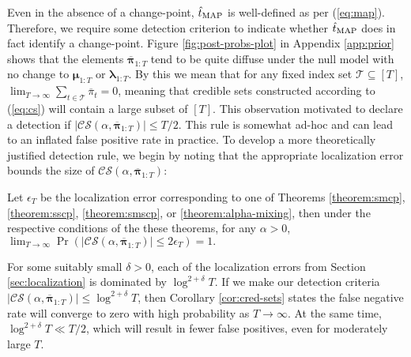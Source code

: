Even in the absence of a change-point, $\hat{t}_{\normalfont \text{MAP}}$ is well-defined as per (\ref{eq:map}). Therefore, we require some detection criterion to indicate whether $\hat{t}_{\normalfont \text{MAP}}$ does in fact identify a change-point. Figure \ref{fig:post-probs-plot} in Appendix \ref{app:prior} shows that the elements $\overline{\boldsymbol{\pi}}_{1:T}$ tend to be quite diffuse under the null model with no change to $\boldsymbol{\mu}_{1:T}$ or $\boldsymbol{\lambda}_{1:T}$. By this we mean that for any fixed index set $\mathcal{T} \subseteq[T]$, $\lim_{T\to\infty} \sum_{t\in\mathcal{T}} \overline{\pi}_t = 0$, meaning that credible sets constructed according to (\ref{eq:cs}) will contain a large subset of $[T]$. This observation motivated \cite{Cappello22} to declare a detection if $|\mathcal{CS}(\alpha,\overline{\boldsymbol{\pi}}_{1:T})| \leq T/2$. This rule is somewhat ad-hoc and can lead to an inflated false positive rate in practice. To develop a more theoretically justified detection rule, we begin by noting that the appropriate localization error bounds the size of $\mathcal{CS}(\alpha, \overline{\boldsymbol{\pi}}_{1:T})$:

\begin{corollary} \label{cor:cred-sets}
    Let $\epsilon_T$ be the localization error corresponding to one of Theorems \ref{theorem:smcp}, \ref{theorem:sscp}, \ref{theorem:smscp}, or \ref{theorem:alpha-mixing}, then under the respective conditions of the these theorems, for any $\alpha > 0$, $\lim_{T \to \infty} \Pr\left(|\mathcal{CS}(\alpha, \overline{\boldsymbol{\pi}}_{1:T})| \leq 2 \epsilon_T \right) = 1.$
\end{corollary}
For some suitably small $\delta > 0$, each of the localization errors from Section \ref{sec:localization} is dominated by $\log^{2+\delta} T$. If we make our detection criteria $|\mathcal{CS}(\alpha,\overline{\boldsymbol{\pi}}_{1:T})| \leq \log^{2+\delta} T$, then Corollary \ref{cor:cred-sets} states the false negative rate will converge to zero with high probability as $T \to \infty$. At the same time, $\log^{2+\delta} T \ll T / 2$, which will result in fewer false positives, even for moderately large $T$. 